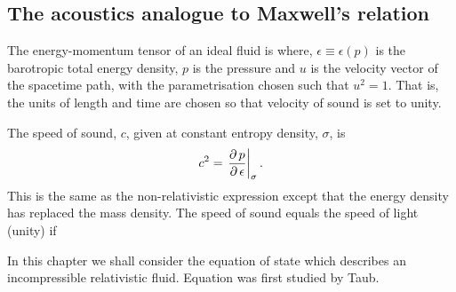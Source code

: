 \subsection{The acoustics analogue to Maxwell's relation}\label{sec:MaxwellAnalogue}

The energy-momentum tensor of an ideal fluid is\cite{LandauBook, Taub1978}
where, $\epsilon \equiv \epsilon(p)$ is the barotropic total energy density,
$p$ is the pressure
and 
$u$ is the velocity vector of the spacetime path, with the parametrisation chosen such that $u^2 =  1$. %
That is, the units of length and time are chosen so that velocity of sound is set to unity.

The speed of sound, $c$,  given at constant entropy density, $\sigma$, is\cite{LandauBook,Taub1978} 
\begin{align}
  c^2 = \left.{\frac{\operatorname{\partial} p}{\operatorname{\partial} \epsilon}}\right|_{\sigma}. \label{eqn:soundspeed}
\end{align}
This is the same as the non-relativistic expression except that the energy density has replaced the mass density.
The speed of sound equals the speed of light (unity) if 

In this chapter we shall consider the equation of state
which describes an incompressible relativistic fluid.
Equation  was first studied by Taub\cite{Taub1978}.

